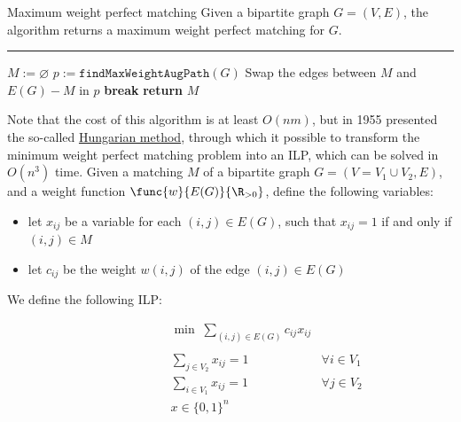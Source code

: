 \documentclass[a4paper, 12pt]{report}
\begin{document}
    \begin{framedalgo}{Maximum weight perfect matching}
        Given a bipartite graph $G = (V, E)$, the algorithm returns a maximum weight perfect matching for $G$. \\
        \hrule

        \quad
        \begin{algorithmic}[1]
                \State $M := \varnothing$
                \Do
                    \State $p := \texttt{findMaxWeightAugPath}(G)$ 
                        \State Swap the edges between $M$ and $E(G) - M$ in $p$
                    \Else
                        \State \textbf{break}
                    \EndIf
                \State \textbf{return} $M$
            \EndFunction
        \end{algorithmic}
    \end{framedalgo}

    Note that the cost of this algorithm is at least $O(n m)$, but in 1955 \textcite{kuhn} presented the so-called \href{https://en.wikipedia.org/wiki/Hungarian_algorithm}{Hungarian method}, through which it possible to transform the minimum weight perfect matching problem into an ILP, which can be solved in $O(n^3)$ time. Given a matching $M$ of a bipartite graph $G = (V = V_1 \cup V_2, E)$, and a weight function $\func{w}{E(G)}{\R_{>0}}$, define the following variables:

    \begin{itemize}
        \item let $x_{ij}$ be a variable for each $(i, j) \in E(G)$, such that $x_{ij} = 1$ if and only if $(i, j) \in M$
        \item let $c_{ij}$ be the weight $w(i, j)$ of the edge $(i, j) \in E(G)$
    \end{itemize}

    We define the following ILP:

    \[\begin{array}{ccc}
        \qquad\qquad\quad
        & \min \; \sum\limits_{(i, j) \in E(G)} {c_{ij}x_{ij}} \\\\
        & \sum\limits_{j \in V_2} {x_{ij}} = 1 & \forall i \in V_1 \\
        & \sum\limits_{i \in V_1} {x_{ij}} = 1 & \forall j \in V_2 \\
        & x \in \{0,1\}^n
    \end{array}\]
\end{document}

